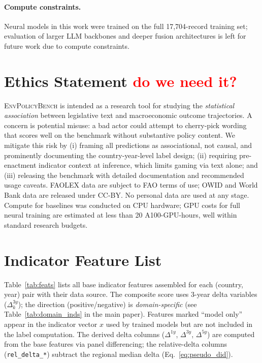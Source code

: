 \documentclass[11pt]{article}
\newcommand{\bench}{\textsc{EnvPolicyBench}}
\begin{document}
\paragraph{Compute constraints.}
Neural models in this work were trained on the full 17{,}704-record training set; evaluation of larger LLM backbones and deeper fusion architectures is left for future work due to compute constraints.

\section*{Ethics Statement \textcolor{red}{do we need it?}}

\bench{} is intended as a research tool for studying the \emph{statistical
association} between legislative text and macroeconomic outcome trajectories.
A concern is potential misuse: a bad actor could attempt to cherry-pick
wording that scores well on the benchmark without substantive policy content.
We mitigate this risk by (i) framing all predictions as associational, not
causal, and prominently documenting the country-year-level label design;
(ii) requiring pre-enactment indicator context at inference, which limits gaming
via text alone; and (iii) releasing the benchmark with detailed documentation
and recommended usage caveats. FAOLEX data are subject to FAO terms of use;
OWID and World Bank data are released under CC-BY. No personal data are used
at any stage. Compute for baselines was conducted on CPU hardware; GPU costs
for full neural training are estimated at less than 20 A100-GPU-hours, well
within standard research budgets.








\appendix

\section{Indicator Feature List}
\label{app:feats}

Table~\ref{tab:feats} lists all base indicator features assembled for each
(country, year) pair with their data source. The composite score uses 3-year
delta variables ($\Delta^{3y}_k$); the direction (positive/negative) is
\emph{domain-specific} (see Table~\ref{tab:domain_inds} in the main paper).
Features marked ``model only'' appear in the indicator vector $x$ used by
trained models but are not included in the label computation.
The derived delta columns ($\Delta^{1y}$, $\Delta^{3y}$, $\Delta^{5y}$) are
computed from the base features via panel differencing; the relative-delta
columns (\texttt{rel\_delta\_*}) subtract the regional median delta
(Eq.~\ref{eq:pseudo_did}).
\end{document}
